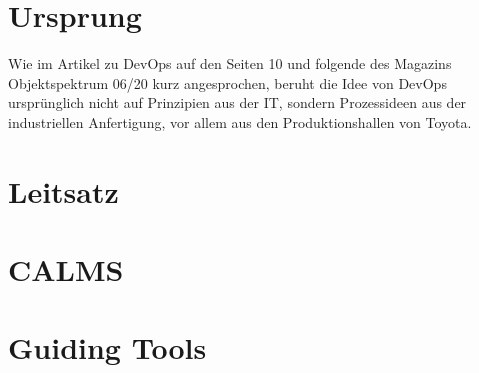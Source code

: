 \section{Ursprung}

Wie im Artikel zu \ac{DevOps} auf den Seiten 10 und folgende des Magazins Objektspektrum 06/20 \cite{spektrum1} kurz angesprochen, beruht die Idee von \ac{DevOps} ursprünglich nicht auf Prinzipien aus der IT, sondern Prozessideen aus der industriellen Anfertigung, vor allem aus den Produktionshallen von Toyota.

\cite{spektrum2}

\section{Leitsatz}

\section{CALMS}

\section{Guiding Tools}